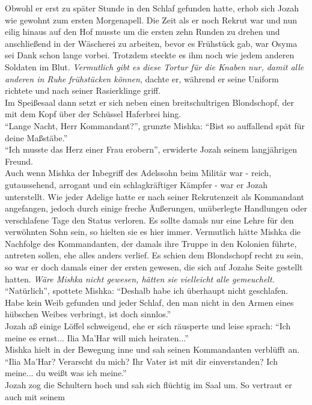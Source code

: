 Obwohl er erst zu später Stunde in den Schlaf gefunden hatte, erhob sich Jozah wie gewohnt zum 
ersten Morgenapell. Die Zeit als er noch Rekrut war und nun eilig hinaus auf den Hof musste um die 
ersten zehn Runden zu drehen und anschließend in der Wäscherei zu arbeiten, bevor es Frühstück gab, 
war Osyma sei Dank schon lange vorbei. Trotzdem steckte es ihm noch wie jedem anderen Soldaten im 
Blut. \textit{Vermutlich gibt es diese Tortur für die Knaben nur, damit alle anderen in Ruhe 
frühstücken können}, dachte er, während er seine Uniform richtete und nach seiner Rasierklinge 
griff.\\
Im Speißesaal dann setzt er sich neben einen breitschultrigen Blondschopf, der mit dem Kopf über 
der Schüssel Haferbrei hing.\\
``Lange Nacht, Herr Kommandant?'', grunzte Mishka: ``Bist so auffallend spät für deine Maßstäbe.''\\
``Ich musste das Herz einer Frau erobern'', erwiderte Jozah seinem langjährigen Freund.\\
Auch wenn Mishka der Inbegriff des Adelssohn beim Militär war - reich, gutaussehend, arrogant und 
ein schlagkräftiger Kämpfer - war er Jozah unterstellt. Wie jeder Adelige hatte er nach seiner 
Rekrutenzeit als Kommandant angefangen, jedoch durch einige freche Äußerungen, unüberlegte 
Handlungen oder verschlafene Tage den Status verloren. Es sollte damals nur eine Lehre für den 
verwöhnten Sohn sein, so hielten sie es hier immer. Vermutlich hätte Mishka die Nachfolge des 
Kommandanten, der damals ihre Truppe in den Kolonien führte, antreten sollen, ehe alles anders 
verlief. Es schien dem Blondschopf recht zu sein, so war er doch damals einer der ersten gewesen, 
die sich auf Jozahs Seite gestellt hatten. \textit{Wäre Mishka nicht gewesen, hätten sie vielleicht 
alle gemeuchelt.}\\
``Natürlich'', spottete Mishka: ``Deshalb habe ich überhaupt nicht geschlafen. Habe kein Weib 
gefunden und jeder Schlaf, den man nicht in den Armen eines hübschen Weibes verbringt, ist doch 
sinnlos.''\\
Jozah aß einige Löffel schweigend, ehe er sich räusperte und leise sprach: ``Ich meine es ernst... 
Ilia Ma'Har will mich heiraten...''\\
Mishka hielt in der Bewegung inne und sah seinen Kommandanten verblüfft an. ``Ilia Ma'Har? 
Verarscht du mich? Ihr Vater ist mit dir einverstanden? Ich meine... du weißt was ich meine.''\\
Jozah zog die Schultern hoch und sah sich flüchtig im Saal um. So vertraut er auch mit seinem 
